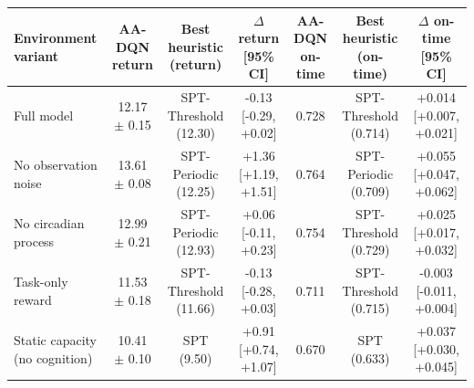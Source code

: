 \begin{tabular}{lcccccc}
\toprule
Environment variant & AA-DQN return & Best heuristic (return) & $\Delta$ return [95\% CI] & AA-DQN on-time & Best heuristic (on-time) & $\Delta$ on-time [95\% CI] \\
\midrule
Full model & 12.17 $\pm$ 0.15 & SPT-Threshold (12.30) & -0.13 [-0.29, +0.02] & 0.728 & SPT-Threshold (0.714) & +0.014 [+0.007, +0.021] \\
No observation noise & 13.61 $\pm$ 0.08 & SPT-Periodic (12.25) & +1.36 [+1.19, +1.51] & 0.764 & SPT-Periodic (0.709) & +0.055 [+0.047, +0.062] \\
No circadian process & 12.99 $\pm$ 0.21 & SPT-Periodic (12.93) & +0.06 [-0.11, +0.23] & 0.754 & SPT-Threshold (0.729) & +0.025 [+0.017, +0.032] \\
Task-only reward & 11.53 $\pm$ 0.18 & SPT-Threshold (11.66) & -0.13 [-0.28, +0.03] & 0.711 & SPT-Threshold (0.715) & -0.003 [-0.011, +0.004] \\
Static capacity (no cognition) & 10.41 $\pm$ 0.10 & SPT (9.50) & +0.91 [+0.74, +1.07] & 0.670 & SPT (0.633) & +0.037 [+0.030, +0.045] \\
\bottomrule
\end{tabular}